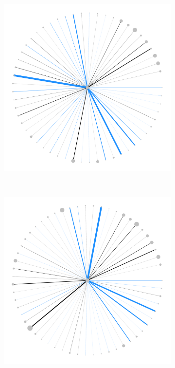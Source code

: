 \documentclass[varwidth, border=0pt]{standalone}
\begin{document}
\begin{figure}
\begin{subfigure}{0.24\linewidth}
				\vspace*{3pt}
			\end{subfigure}~%
			\begin{subfigure}{0.24\linewidth}
				\centering
				\includegraphics[width=\linewidth]{../../graphics/evolution/responsibility-de-wphg-2012.pdf}%
				\vspace*{3pt}
			\end{subfigure}~%
			\begin{subfigure}{0.24\linewidth}
				\includegraphics[width=\linewidth]{../../graphics/evolution/responsibility-de-wphg-2019.pdf}%

\end{subfigure}
\end{figure}
\end{document}
